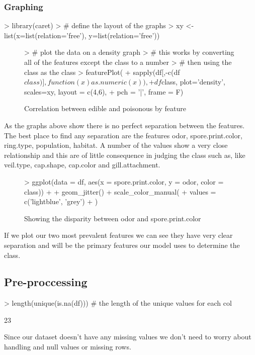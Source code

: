 \documentclass[12pt]{article}         %
\begin{document}
\subsubsection{Graphing}
\begin{Schunk}
\begin{Sinput}
> library(caret)
> # define the layout of the graphs
> xy <- list(x=list(relation='free'), y=list(relation='free'))
\end{Sinput}
\end{Schunk}
\begin{figure}[H]
\begin{center}
\begin{Schunk}
\begin{Sinput}
> # plot the data on a density graph
> # this works by converting all of the features except the class to a number
> #  then using the class as the class
> featurePlot(
+ 	sapply(df[,-c(df$class)], function (x) as.numeric(x)),
+ 	df$class, plot='density', scales=xy, layout = c(4,6),
+ 	pch = '|', frame = F)
\end{Sinput}
\end{Schunk}
\caption {Correlation between edible and poisonous by feature}
\label{fig2}
\end {center}
\end {figure}
As the graphs above show there is no perfect separation between the features. The best place to find any separation are the features odor, spore.print.color, ring.type, population, habitat. A number of the values show a very close relationship and this are of little consequence in judging the class such as, like veil.type, cap.shape, cap.color and gill.attachment.
\pagebreak\begin{figure}[H]
\begin{center}
\begin{Schunk}
\begin{Sinput}
> ggplot(data = df, aes(x = spore.print.color, y = odor, color = class)) + 
+ 	geom_jitter() + scale_color_manual(
+ 		values = c('lightblue', 'grey')
+ 	)
\end{Sinput}
\end{Schunk}
\caption {Showing the disparity between odor and spore.print.color}
\label{fig3}
\end {center}
\end {figure}
If we plot our two most prevalent features we can see they have very clear separation and will be the primary features our model uses to determine the class.
\pagebreak\subsection{Pre-proccessing}
\begin{Schunk}
\begin{Sinput}
> length(unique(is.na(df))) # the length of the unique values for each col
\end{Sinput}
\begin{Soutput}
[1] 23
\end{Soutput}
\end{Schunk}
Since our dataset doesn't have any missing values we don't need to worry about handling and null values or missing rows.
\end{document}
